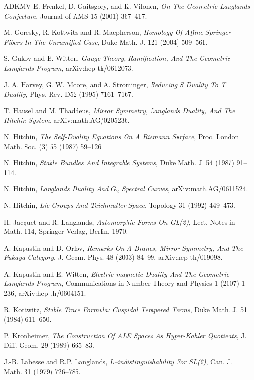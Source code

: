 \documentclass[11pt,a4paper]{article}
\begin{document}
\begin{thebibliography}{ADKMV}
 E. Frenkel, D. Gaitsgory, and K. Vilonen, \emph{On The Geometric Langlands Conjecture}, Journal of AMS 15 (2001) 367--417.

 M. Goresky, R. Kottwitz and R. Macpherson, \emph{Homology Of Affine Springer Fibers In The Unramified Case}, Duke Math. J. 121 (2004) 509--561.

 S. Gukov and E. Witten, \emph{Gauge Theory, Ramification, And The Geometric Langlands Program}, arXiv:hep-th/0612073.

 J. A. Harvey, G. W. Moore, and A. Strominger, \emph{Reducing S Duality To T Duality}, Phys. Rev. D52 (1995) 7161--7167.

 T. Hausel and M. Thaddeus, \emph{Mirror Symmetry, Langlands Duality, And The Hitchin System}, arXiv:math.AG/0205236.

 N. Hitchin, \emph{The Self-Duality Equations On A Riemann Surface}, Proc. London Math. Soc. (3) 55 (1987) 59--126.

 N. Hitchin, \emph{Stable Bundles And Integrable Systems}, Duke Math. J. 54 (1987) 91--114.

 N. Hitchin, \emph{Langlands Duality And $G_2$ Spectral Curves}, arXiv:math.AG/0611524.

 N. Hitchin, \emph{Lie Groups And Teichmuller Space}, Topology 31 (1992) 449--473.

 H. Jacquet and R. Langlands, \emph{Automorphic Forms On GL(2)}, Lect. Notes in Math. 114, Springer-Verlag, Berlin, 1970.

 A. Kapustin and D. Orlov, \emph{Remarks On A-Branes, Mirror Symmetry, And The Fukaya Category}, J. Geom. Phys. 48 (2003) 84--99, arXiv:hep-th/019098.

 A. Kapustin and E. Witten, \emph{Electric-magnetic Duality And The Geometric Langlands Program}, Communications in Number Theory and Physics 1 (2007) 1--236, arXiv:hep-th/0604151.

 R. Kottwitz, \emph{Stable Trace Formula: Cuspidal Tempered Terms}, Duke Math. J. 51 (1984) 611--650.

 P. Kronheimer, \emph{The Construction Of ALE Spaces As Hyper-Kahler Quotients}, J. Diff. Geom. 29 (1989) 665--83.

 J.-B. Labesse and R.P. Langlands, \emph{L--indistinguishability For SL(2)}, Can. J. Math. 31 (1979) 726--785.


\end{thebibliography}
\end{document}
